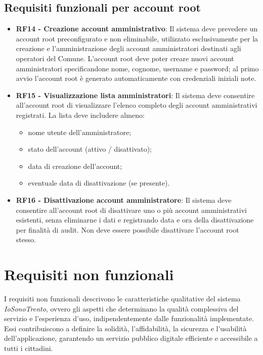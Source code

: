 \documentclass{article}
\begin{document}
\subsection{Requisiti funzionali per account root}
\begin{itemize}
    \item \textbf{RF14 - Creazione account amministrativo}: Il sistema deve prevedere un account root preconfigurato e non eliminabile, utilizzato esclusivamente per la creazione e l'amministrazione degli account amministratori destinati agli operatori del Comune. L'account root deve poter creare nuovi account amministratori specificandone nome, cognome, username e password; al primo avvio l'account root è generato automaticamente con credenziali iniziali note.
    \item \textbf{RF15 - Visualizzazione lista amministratori}: Il sistema deve consentire all'account root di visualizzare l'elenco completo degli account amministrativi registrati. La lista deve includere almeno:
		\begin{itemize}
			\item nome utente dell'amministratore;
			\item stato dell'account (attivo / disattivato);
			\item data di creazione dell'account;
			\item eventuale data di disattivazione (se presente).
		\end{itemize}
    \item \textbf{RF16 - Disattivazione account amministratore}: Il sistema deve consentire all'account root di disattivare uno o più account amministrativi esistenti, senza eliminarne i dati e registrando data e ora della disattivazione per finalità di audit. Non deve essere possibile disattivare l'account root stesso.
\end{itemize}

\section{Requisiti non funzionali}  
I requisiti non funzionali descrivono le caratteristiche qualitative del sistema \textit{IoSonoTrento}, ovvero gli aspetti che determinano la qualità complessiva del servizio e l’esperienza d’uso, indipendentemente dalle funzionalità implementate. Essi contribuiscono a definire la solidità, l’affidabilità, la sicurezza e l’usabilità dell’applicazione, garantendo un servizio pubblico digitale efficiente e accessibile a tutti i cittadini.
\end{document}
